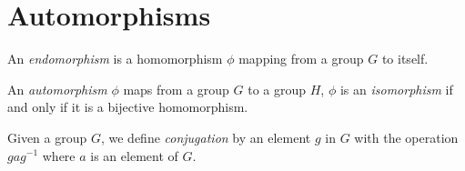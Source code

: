\section{Automorphisms}

\begin{definition}[Endomorphism]
    \label{definition : Endomorphism}
    \leanok
    An \emph{endomorphism} is a homomorphism \( \phi \) mapping from a group \( G \) to itself.
\end{definition}

\begin{definition}[Automorphism]
    \label{definition : Automorphism}
    \leanok
    An \emph{automorphism} \( \phi \) maps from a group \( G \) to a group \( H \), \( \phi
    \) is an \emph{isomorphism} if and only if it is a bijective homomorphism.
\end{definition}

\begin{definition}[Conjugate]
    \label{definition : Conjugate}
    \leanok
    Given a group \( G \), we define \emph{conjugation} by an element
    \( g \) in \( G \) with the operation \( g ag^{-1} \) where \( a \) is an
    element of \( G \).
\end{definition}

